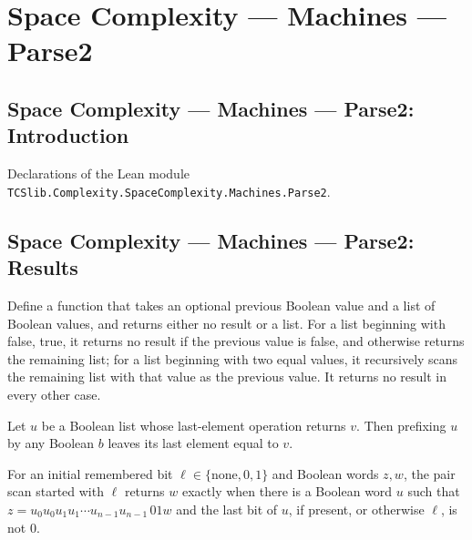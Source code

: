 \section{Space Complexity --- Machines --- Parse2}
\subsection*{Space Complexity --- Machines --- Parse2: Introduction}

Declarations of the Lean module \texttt{TCSlib.Complexity.SpaceComplexity.Machines.Parse2}.

\subsection*{Space Complexity --- Machines --- Parse2: Results}

\begin{definition}
\label{Complexity.LogProg.scanPairs}
\leanok
Define a function that takes an optional previous Boolean value and a list of Boolean
values, and returns either no result or a list. For a list beginning with false, true,
it returns no result if the previous value is false, and otherwise returns the remaining
list; for a list beginning with two equal values, it recursively scans the remaining
list with that value as the previous value. It returns no result in every other case.
\end{definition}

\begin{lemma}
\leanok
{}
Let $u$ be a Boolean list whose last-element operation returns $v$. Then prefixing $u$
by any Boolean $b$ leaves its last element equal to $v$.
\end{lemma}

\begin{lemma}
\label{Complexity.LogProg.scanPairs_iff}
\leanok
{}
For an initial remembered bit $\ell\in\{\mathrm{none},0,1\}$ and Boolean words $z,w$,
the pair scan started with $\ell$ returns $w$ exactly when there is a Boolean word $u$
such that $z=u_0u_0u_1u_1\cdots u_{n-1}u_{n-1}\,01w$ and the last bit of $u$, if
present, or otherwise $\ell$, is not $0$.
\end{lemma}

